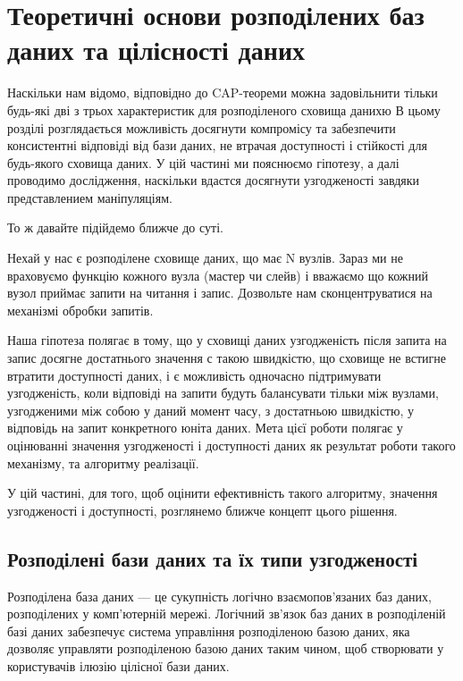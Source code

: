 \documentclass[14pt]{vakthesis}
\begin{document}
\chapter{Теоретичні основи розподілених баз даних та цілісності даних}

Наскільки нам відомо, відповідно до CAP-теореми можна задовільнити тільки будь-які дві з трьох характеристик
для розподіленого сховища данихю
В цьому розділі розглядається можливість досягнути компромісу та забезпечити консистентні відповіді 
від бази даних, не втрачая доступності і стійкості для будь-якого сховища даних.
У цій частині ми пояснюємо гіпотезу, а далі проводимо дослідження, наскільки вдастся досягнути узгодженості завдяки
представлением маніпуляціям.

То ж давайте підійдемо ближче до суті.

Нехай у нас є розподілене сховище даних, що має N вузлів. Зараз ми не враховуємо функцію кожного вузла (мастер чи слейв) і 
вважаємо що кожний вузол приймає запити на читання і запис. Дозвольте нам сконцентруватися на механізмі обробки запитів.

Наша гіпотеза полягає в тому, що у сховищі даних узгодженість після запита на запис досягне достатнього значення с такою швидкістю, що сховище не встигне втратити доступності даних, і є можливість одночасно підтримувати узгодженість, коли відповіді на запити будуть балансувати тільки між вузлами, узгодженими між собою у даний момент часу, з достатньою швидкістю, у відповідь на запит конкретного юніта даних.
Мета цієї роботи полягає у оцінюванні значення узгодженості і доступності даних як результат роботи такого механізму, та алгоритму реалізації.

У цій частині, для того, щоб оцінити ефективність такого алгоритму, значення узгодженості і доступності, розглянемо ближче концепт цього рішення.
\section{Розподілені бази даних та їх типи узгодженості}

Розподілена база даних — це сукупність логічно взаємопов'язаних баз даних, розподілених у комп'ютерній мережі. Логічний зв'язок баз даних в розподіленій базі даних забезпечує система управління розподіленою базою даних, яка дозволяє управляти розподіленою базою даних таким чином, щоб створювати у користувачів ілюзію цілісної бази даних. 
\end{document}

